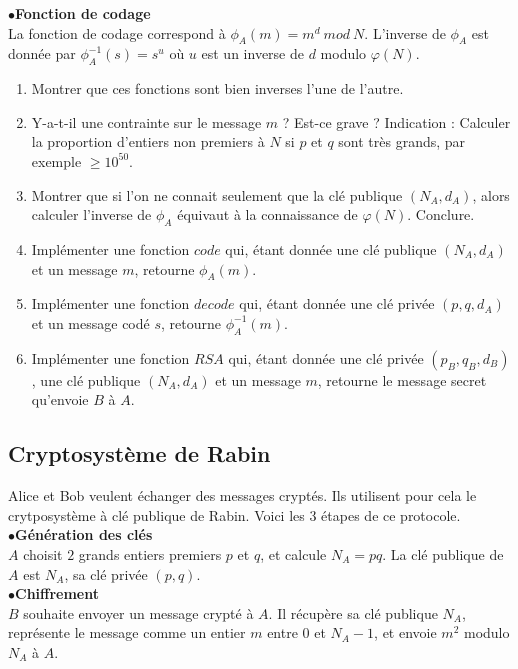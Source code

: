 $\bullet$\textbf{Fonction de codage}\\
La fonction de codage correspond à $\phi_A(m)= m^d \ mod\ N$. L'inverse de $\phi_A$ est donnée par $\phi_A^{-1}(s)=s^u$ où $u$ est un inverse de $d$ modulo $\varphi(N)$.\\

\begin{enumerate}
\item Montrer que ces fonctions sont bien inverses l'une de l'autre.
\item Y-a-t-il une contrainte sur le message $m$ ? Est-ce grave ? Indication : Calculer la proportion d'entiers non premiers à $N$ si $p$ et $q$ sont très grands, par exemple $\geq 10^50$.
\item Montrer que si l'on ne connait seulement que la clé publique $(N_A,d_A)$, alors calculer l'inverse de $\phi_A$ équivaut à la connaissance de $\varphi(N)$. Conclure.
\item Implémenter une fonction $code$ qui, étant donnée une clé publique $(N_A,d_A)$ et un message $m$, retourne $\phi_A(m)$.  
\item Implémenter une fonction $decode$ qui, étant donnée une clé privée $(p,q,d_A)$ et un message codé $s$, retourne $\phi_A^{-1}(m)$.  
\item Implémenter une fonction $RSA$ qui, étant donnée une clé privée $(p_B,q_B,d_B)$, une clé publique $(N_A,d_A)$ et un message $m$, retourne le message secret qu'envoie $B$ à $A$. 
\end{enumerate} 
 
\subsection{Cryptosystème de Rabin}

Alice et Bob veulent échanger des messages cryptés. Ils utilisent pour cela le crytposystème à clé publique de Rabin. Voici les $3$ étapes de ce protocole.\\

$\bullet$\textbf{Génération des clés}\\
$A$ choisit $2$ grands entiers premiers $p$ et $q$, et calcule $N_A=pq$. La clé publique de $A$ est $N_A$, sa clé privée $(p,q)$.  \\

$\bullet$\textbf{Chiffrement}\\
$B$ souhaite envoyer un message crypté à $A$. Il récupère sa clé publique $N_A$, représente le message comme un entier $m$ entre $0$ et $N_A-1$, et envoie $m^2 $ modulo $N_A$ à $A$.\\

